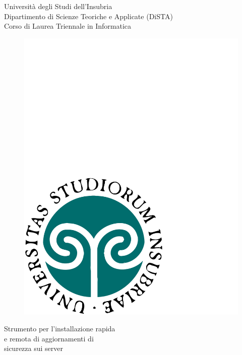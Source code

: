 \begin{titlepage}
  \begin{center}
    \begin{large}
      {\fontsize{20}{18}\selectfont\vspace*{0.50cm}Universit\`a degli Studi dell'Insubria}\\
      Dipartimento di Scienze Teoriche e Applicate (DiSTA)\\
      Corso di Laurea Triennale in Informatica
    \end{large}

    \vspace{1cm}
    \begin{figure}[h]
      \begin{center}
        \includegraphics[scale=0.30]{copertina/logounivector.pdf}
      \end{center}
    \end{figure}
      {
        \fontsize{26}{26}\selectfont\par\vspace*{0.75cm}
        Strumento per l'installazione rapida\\
        e remota di aggiornamenti di\\
        sicurezza sui server\\
      }
    \par


\end{center}
\end{titlepage}
